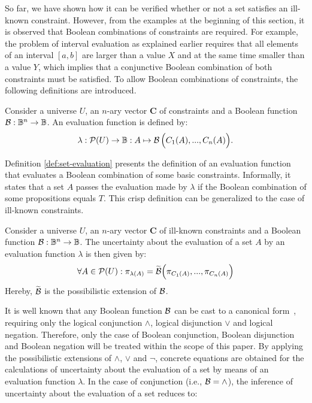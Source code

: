 So far, we have shown how it can be verified whether or not a set satisfies an ill-known constraint. However, from the examples at the beginning of this section, it is observed that Boolean combinations of constraints are required. For example, the problem of interval evaluation as explained earlier requires that all elements of an interval $[a,b]$ are larger than a value $X$ and at the same time smaller than a value $Y$, which implies that a conjunctive Boolean combination of both constraints must be satisfied. To allow Boolean combinations of constraints, the following definitions are introduced.
\begin{definition}
\label{def:set-evaluation}
Consider a universe $U$, an $n$-ary vector $\mathbf{C}$ of constraints and a Boolean function $\operatorname*{\mathcal{B}}:\mathbb{B}^{n}\rightarrow\mathbb{B}$. An evaluation function is defined by:
\begin{equation}
\lambda:\mathcal{P}(U)\rightarrow\mathbb{B}:A\mapsto\operatorname*{\mathcal{B}}\Big(C_{1}(A),...,C_{n}(A)\Big).
\end{equation}
\end{definition}
Definition \ref{def:set-evaluation} presents the definition of an evaluation function that evaluates a Boolean combination of some basic constraints. Informally, it states that a set $A$ passes the evaluation made by $\lambda$ if the Boolean combination of some propositions equals $T$. This crisp definition can be generalized to the case of ill-known constraints.
\begin{definition}
\label{def:ill-known-sets}
Consider a universe $U$, an $n$-ary vector $\mathbf{C}$ of ill-known constraints and a Boolean function $\operatorname*{\mathcal{B}}:\mathbb{B}^{n}\rightarrow\mathbb{B}$. The uncertainty about the evaluation of a set $A$ by an evaluation function $\lambda$ is then given by:
\begin{equation}
\forall A\in\mathcal{P}(U):\pi_{\lambda(A)}=\widetilde{\operatorname*{\mathcal{B}}}\Big(\pi_{C_1(A)},...,\pi_{C_n(A)}\Big)\\
\end{equation}
Hereby, $\widetilde{\operatorname*{\mathcal{B}}}$ is the possibilistic extension of $\operatorname*{\mathcal{B}}$.
\end{definition}
It is well known that any Boolean function $\operatorname*{\mathcal{B}}$ can be cast to a canonical form~\cite{McCluskey1965}, requiring only the logical conjunction $\wedge$, logical disjunction $\vee$ and logical negation. Therefore, only the case of Boolean conjunction, Boolean disjunction and Boolean negation will be treated within the scope of this paper. By applying the possibilistic extensions of $\wedge$, $\vee$ and $\neg$, concrete equations are obtained for the calculations of uncertainty about the evaluation of a set by means of an evaluation function $\lambda$. In the case of conjunction (i.e., $\operatorname*{\mathcal{B}}=\wedge$), the inference of uncertainty about the evaluation of a set reduces to:
